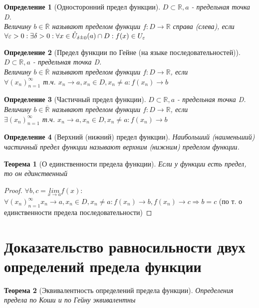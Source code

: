 \documentclass[11pt,a4paper,titlepage]{article}
\newtheorem*{theorem}{Теорема}
\newtheorem*{definition}{Определение}
\renewcommand{\lim}[2]{\underset{#1 \rightarrow #2}{lim}}
\renewcommand{\implies}{\Rightarrow}
\renewcommand{\epsilon}{\varepsilon}
\newcommand{\rpm}{\raisebox{.2ex}{$\scriptstyle\pm$}}
\newcommand{\R}{\mathbb{R}}
\renewcommand{\U}{\mathring{U}}
\begin{document}
    \begin{definition}[Односторонний предел функции]
        $D \subset \R, a$ - предельная точка D.\\
        Величину $b \in \overline{\R}$ называют пределом функции $f: D \to \R$ справа (слева), если\\
        $\forall \epsilon > 0: \exists \delta > 0: \forall x \in \U_{\delta\rpm0}(a) \cap D: f(x) \in U_\epsilon$
    \end{definition}

    \begin{definition}[Предел функции по Гейне (на языке последовательностей)]
        $D \subset \R, a$ - предельная точка D.\\
        Величину $b \in \overline{\R}$ называют пределом функции $f: D \to \R$, если\\
        $\forall (x_n)_{n=1}^\infty$ т.ч. $x_n \to a, x_n \in D, x_n \neq a: f(x_n) \to b$
    \end{definition}

    \begin{definition}[Частичный предел функции]
        $D \subset \R, a$ - предельная точка D.\\
        Величину $b \in \overline{\R}$ называют пределом функции $f: D \to \R$, если\\
        $\exists (x_n)_{n=1}^\infty$ т.ч. $x_n \to a, x_n \in D, x_n \neq a: f(x_n) \to b$
    \end{definition}

    \begin{definition}[Верхний (нижний) предел функции]
        Наибольший (наименьший) частичный предел функции называют верхним (нижним) пределом функции.
    \end{definition}

    \begin{theorem}[О единственности предела функции]
        Если у функции есть предел, то он единственный
    \end{theorem}

    \begin{proof}
        $\forall b, c = \lim{x}{a}f(x):$\\
        $\forall (x_n)_{n=1}^\infty x_n\to a, x_n\in D, x_n \neq a: f(x_n) \to b, f(x_n) \to c \implies b = c$ (по т. о единственности предела последовательности)
    \end{proof}


    \section{Доказательство равносильности двух определений предела функции}
    \begin{theorem}[Эквивалентность определений предела функции]
        Определения предела по Коши и по Гейну эквивалентны
    \end{theorem}
\end{document}
